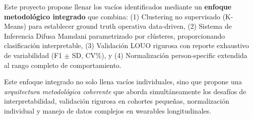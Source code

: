 Este proyecto propone llenar los vacíos identificados mediante un \textbf{enfoque metodológico integrado} que combina: (1) Clustering no supervisado (K-Means) para establecer ground truth operativa data-driven, (2) Sistema de Inferencia Difusa Mamdani parametrizado por clústeres, proporcionando clasificación interpretable, (3) Validación LOUO rigurosa con reporte exhaustivo de variabilidad (F1 $\pm$ SD, CV\%), y (4) Normalización person-specific extendida al rango completo de comportamiento.

Este enfoque integrado no solo llena vacíos individuales, sino que propone una \textit{arquitectura metodológica coherente} que aborda simultáneamente los desafíos de interpretabilidad, validación rigurosa en cohortes pequeñas, normalización individual y manejo de datos complejos en wearables longitudinales.